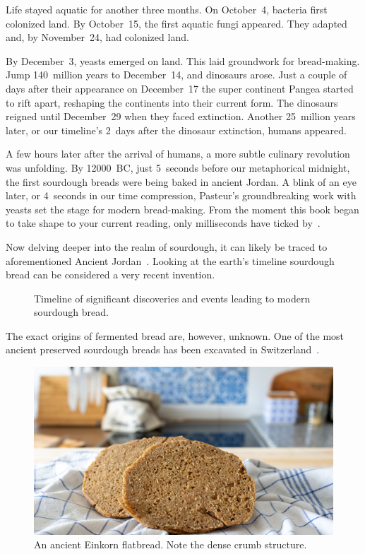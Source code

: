 Life stayed aquatic for another three months.
On October~4, bacteria first colonized land. By October~15, the
first aquatic fungi appeared. They adapted and, by November~24, had colonized
land.

By December~3, yeasts emerged on land. This laid groundwork for bread-making.
Jump 140~million years to December~14, and dinosaurs arose. Just a couple
of days after their appearance on December~17 the super continent Pangea
started to rift apart, reshaping the continents into their current form.
The dinosaurs reigned until December~29 when they faced extinction.
Another 25~million years later, or our timeline's 2~days after the dinosaur
extinction, humans appeared.

A few hours later after the arrival of humans, a more subtle culinary
revolution was unfolding. By \num{12000}~BC, just 5~seconds before our
metaphorical midnight, the first sourdough breads were being baked in ancient
Jordan. A blink of an eye later, or 4~seconds in our time compression,
Pasteur's groundbreaking work with yeasts set the stage for modern
bread-making. From the moment this book began to take shape to your current
reading, only milliseconds have ticked by~\cite{Yong+2017}.

Now delving deeper into the realm of sourdough, it can likely be traced to aforementioned
Ancient Jordan~\cite{jordan+bread}. Looking at the earth's timeline sourdough
bread can be considered a very recent invention.

\begin{figure}[!htb]
  \centering
  
  \caption[Sourdough history timeline]{Timeline of significant discoveries and
  events leading to modern sourdough bread.}%
  \label{fig:sourdough-timeline}
\end{figure}

The exact origins of fermented
bread are, however, unknown. One of the most ancient preserved
sourdough breads has been excavated in Switzerland~\cite{switzerland+bread}.

\begin{figure}[ht]
  \centering
  \includegraphics[width=\textwidth]{einkorn-crumb}
  \caption[Ancient Einkorn flatbread]{An ancient Einkorn flatbread. Note the
      dense crumb structure.}%
  \label{fig:einkorn-crumb}
\end{figure}

